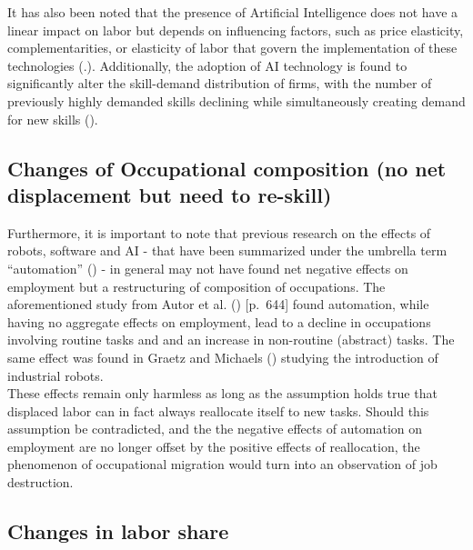\documentclass[
  11,
  a4paperpaper,
]{article}
\begin{document}
It has also been noted that the presence of Artificial Intelligence does
not have a linear impact on labor but depends on influencing factors,
such as price elasticity, complementarities, or elasticity of labor that
govern the implementation of these technologies
(.). Additionally, the adoption of AI technology is found to
significantly alter the skill-demand distribution of firms, with the
number of previously highly demanded skills declining while
simultaneously creating demand for new skills
().

\subsection{Changes of Occupational composition (no net displacement but
need to
re-skill)}\label{changes-of-occupational-composition-no-net-displacement-but-need-to-re-skill}

Furthermore, it is important to note that previous research on the
effects of robots, software and AI - that have been summarized under the
umbrella term ``automation'' () - in general may not have found net negative
effects on employment but a restructuring of composition of occupations.
The aforementioned study from Autor et al.
() {[}p.~644{]} found
automation, while having no aggregate effects on employment, lead to a
decline in occupations involving routine tasks and and an increase in
non-routine (abstract) tasks. The same effect was found in Graetz and
Michaels () studying the
introduction of industrial robots.\\
These effects remain only harmless as long as the assumption holds true
that displaced labor can in fact always reallocate itself to new tasks.
Should this assumption be contradicted, and the the negative effects of
automation on employment are no longer offset by the positive effects of
reallocation, the phenomenon of occupational migration would turn into
an observation of job destruction.

\subsection{Changes in labor share}\label{changes-in-labor-share}
\end{document}

